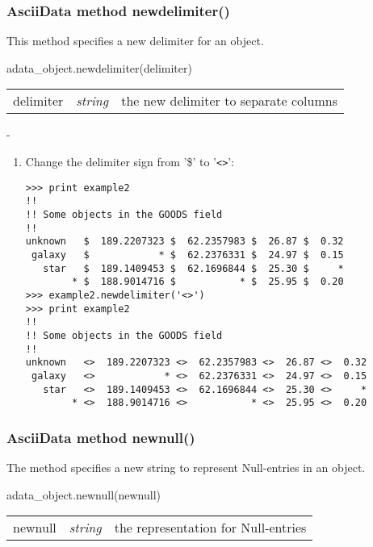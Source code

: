 \subsubsection{AsciiData method newdelimiter()}
\label{adm_newdelimiter}
This method specifies a new delimiter for an \ad object.

adata\_object.newdelimiter(delimiter)

\begin{tabular}{lcl}
delimiter &{\it string}& the new delimiter to separate columns\\
\end{tabular}

-

\begin{enumerate}
\item Change the delimiter sign from '\$' to '\verb+<>+':
\begin{small}
\begin{verbatim}
>>> print example2
!!
!! Some objects in the GOODS field
!!
unknown   $  189.2207323 $  62.2357983 $  26.87 $  0.32
 galaxy   $            * $  62.2376331 $  24.97 $  0.15
   star   $  189.1409453 $  62.1696844 $  25.30 $     *
        * $  188.9014716 $           * $  25.95 $  0.20
>>> example2.newdelimiter('<>')
>>> print example2
!!
!! Some objects in the GOODS field
!!
unknown   <>  189.2207323 <>  62.2357983 <>  26.87 <>  0.32
 galaxy   <>            * <>  62.2376331 <>  24.97 <>  0.15
   star   <>  189.1409453 <>  62.1696844 <>  25.30 <>     *
        * <>  188.9014716 <>           * <>  25.95 <>  0.20
\end{verbatim}
\end{small}
\end{enumerate}

\subsubsection{AsciiData method newnull()}
\label{adm_newnull}
The method specifies a new string to represent Null-entries in an
\ad object.

adata\_object.newnull(newnull)

\begin{tabular}{lcl}
newnull &{\it string}& the representation for Null-entries\\
\end{tabular}


